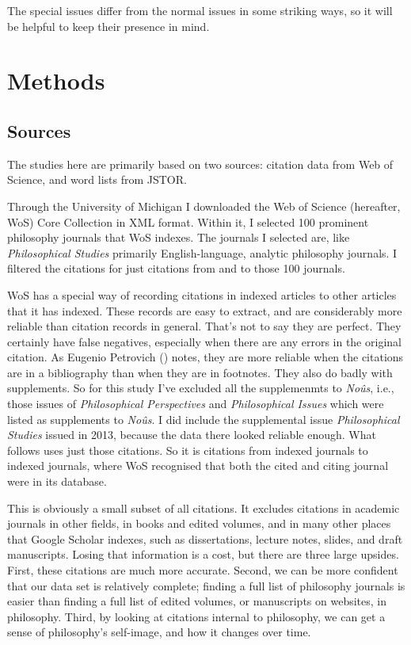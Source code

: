 \documentclass[
  11pt,
  letterpaper,
  DIV=11,
  numbers=noendperiod,
  twoside]{scrartcl}
\begin{document}
The special issues differ from the normal issues in some striking ways,
so it will be helpful to keep their presence in mind.

\section{Methods}\label{sec-methods}

\subsection{Sources}\label{sec-sources}

The studies here are primarily based on two sources: citation data from
Web of Science, and word lists from JSTOR.

Through the University of Michigan I downloaded the Web of Science
(hereafter, WoS) Core Collection in XML format. Within it, I selected
100 prominent philosophy journals that WoS indexes. The journals I
selected are, like \emph{Philosophical Studies} primarily
English-language, analytic philosophy journals. I filtered the citations
for just citations from and to those 100 journals.

WoS has a special way of recording citations in indexed articles to
other articles that it has indexed. These records are easy to extract,
and are considerably more reliable than citation records in general.
That's not to say they are perfect. They certainly have false negatives,
especially when there are any errors in the original citation. As
Eugenio Petrovich () notes,
they are more reliable when the citations are in a bibliography than
when they are in footnotes. They also do badly with supplements. So for
this study I've excluded all the supplemenmts to \emph{Noûs}, i.e.,
those issues of \emph{Philosophical Perspectives} and
\emph{Philosophical Issues} which were listed as supplements to
\emph{Noûs}. I did include the supplemental issue \emph{Philosophical
Studies} issued in 2013, because the data there looked reliable enough.
What follows uses just those citations. So it is citations from indexed
journals to indexed journals, where WoS recognised that both the cited
and citing journal were in its database.

This is obviously a small subset of all citations. It excludes citations
in academic journals in other fields, in books and edited volumes, and
in many other places that Google Scholar indexes, such as dissertations,
lecture notes, slides, and draft manuscripts. Losing that information is
a cost, but there are three large upsides. First, these citations are
much more accurate. Second, we can be more confident that our data set
is relatively complete; finding a full list of philosophy journals is
easier than finding a full list of edited volumes, or manuscripts on
websites, in philosophy. Third, by looking at citations internal to
philosophy, we can get a sense of philosophy's self-image, and how it
changes over time.
\end{document}
